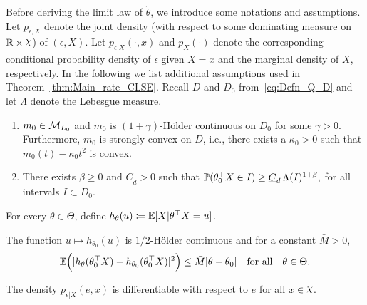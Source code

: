 {Before deriving the limit law of $\check{\theta}$, we introduce some  notations and assumptions.
 Let $p_{\epsilon,X}$ denote the joint density (with respect to some dominating measure on $\R \times \rchi$) of $(\epsilon, X)$. Let $p_{\epsilon|X} (\cdot,x)$ and $p_X(\cdot)$ denote the corresponding conditional probability density of $\epsilon$ given $X = x$ and the marginal density of $X$, respectively. In the following we list additional assumptions used in Theorem~\ref{thm:Main_rate_CLSE}. Recall $D$ and $D_0$ from~\eqref{eq:Defn_Q_D} and let  $\Lambda$ denote the Lebesgue measure.
 \begin{enumerate}[label=\bfseries (B\arabic*)]
\setcounter{enumi}{0}
 \item $m_0\in \mathcal{M}_{L_0}$ and  $m_0$ is $(1+ \gamma)$-H\"{o}lder continuous on $D_0$ for some $\gamma>0$. Furthermore, $m_0$ is strongly convex on $D$, i.e., there exists a $\kappa_0>0$ such that  $m_0(t)- \kappa_0 t^2$ is convex.   \label{bb1}

 \item  There exists $\beta\ge 0$ and $\underline{C}_d>0$ such that $\mathbb{P}(\theta_0^\top X \in I) \ge \underline{C}_d\,\Lambda(I)^{1 + \beta},$  for all intervals $I \subset D_0$. \label{bb2'}
  
\end{enumerate}
For every $\theta\in\Theta$, define  $h_\theta(u) \coloneqq \mathbb{E}[X |\theta^\top X=u]$.
 \begin{enumerate}[label=\bfseries (B\arabic*)]
\setcounter{enumi}{2}
{\item 
The function $u\mapsto h_{\theta_0}(u)$ is $1/2$-H\"{o}lder continuous and for a constant $\bar{M}>0$,\label{bb2}
\begin{equation}\label{eq:L_2Lip}
\mathbb{E}\Big(|h_{\theta}(\theta_0^{\top}X) - h_{\theta_0}(\theta_0^{\top}X)|^2\Big) \le \bar{M}|\theta - \theta_0|\quad\mbox{for all}\quad \theta\in\Theta.
\end{equation}}
\item The  density $p_{\epsilon|X} (e,x)$ is differentiable with respect to $e$ for all $x\in \rchi$.
\label{bb3}
\end{enumerate}

}
